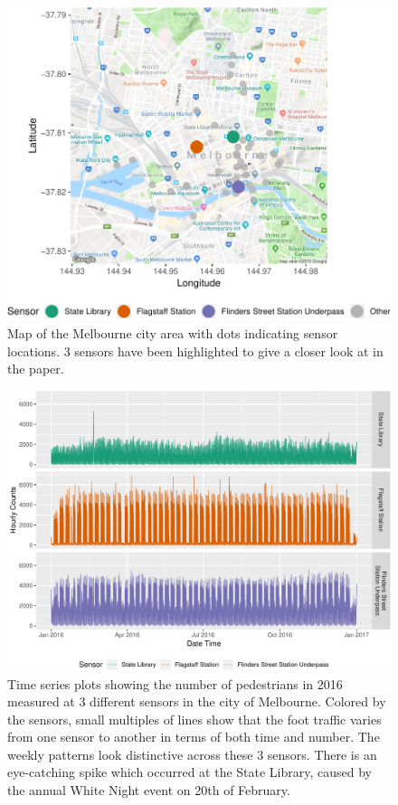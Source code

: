 \begin{Schunk}
\begin{figure}

{\centering \includegraphics[width=0.7\linewidth]{figure/ped-map-1} 

}

\caption[Map of the Melbourne city area with dots indicating sensor locations]{Map of the Melbourne city area with dots indicating sensor locations. 3 sensors have been highlighted to give a closer look at in the paper.}\label{fig:ped-map}
\end{figure}
\end{Schunk}

\begin{Schunk}
\begin{figure}

{\centering \includegraphics[width=\textwidth]{figure/time-series-plot-1} 

}

\caption[Time series plots showing the number of pedestrians in 2016 measured at 3 different sensors in the city of Melbourne]{Time series plots showing the number of pedestrians in 2016 measured at 3 different sensors in the city of Melbourne. Colored by the sensors, small multiples of lines show that the foot traffic varies from one sensor to another in terms of both time and number. The weekly patterns look distinctive across these 3 sensors. There is an eye-catching spike which occurred at the State Library, caused by the annual White Night event on 20th of February.}\label{fig:time-series-plot}
\end{figure}
\end{Schunk}

